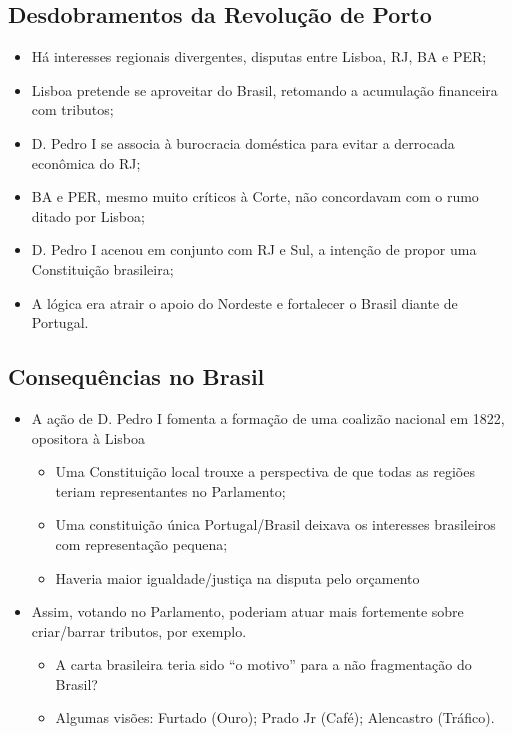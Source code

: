 \documentclass[a4paper,12pt]{article}[abntex2]
\begin{document}
\subsection{\textbf{Desdobramentos da Revolução de Porto}}
\begin{itemize}
    \item Há interesses regionais divergentes, disputas entre Lisboa, RJ, BA e
PER;
\item Lisboa pretende se aproveitar do Brasil, retomando a acumulação
financeira com tributos;
\item D. Pedro I se associa à burocracia doméstica para evitar a derrocada
econômica do RJ;
\item BA e PER, mesmo muito críticos à Corte, não concordavam com o rumo ditado por Lisboa;
\item D. Pedro I acenou em conjunto com RJ e Sul, a intenção de propor uma Constituição brasileira;
\item A lógica era atrair o apoio do Nordeste e fortalecer o Brasil diante de
Portugal.
\end{itemize}
\subsection{\textbf{Consequências no Brasil}}
\begin{itemize}
    \item A ação de D. Pedro I fomenta a formação de uma coalizão nacional em
1822, opositora à Lisboa
\begin{itemize}
    \item Uma Constituição local trouxe a perspectiva de que todas as regiões teriam representantes no Parlamento;
    \item Uma constituição única Portugal/Brasil deixava os interesses brasileiros com representação pequena;
\item Haveria maior igualdade/justiça na disputa pelo orçamento

\end{itemize}
\item Assim, votando no Parlamento, poderiam atuar mais fortemente sobre
criar/barrar tributos, por exemplo.
\begin{itemize}
    \item A carta brasileira teria sido “o motivo” para a não fragmentação do Brasil?
    \item Algumas visões: Furtado (Ouro); Prado Jr (Café); Alencastro (Tráfico).
\end{itemize}
\end{itemize}
\end{document}
